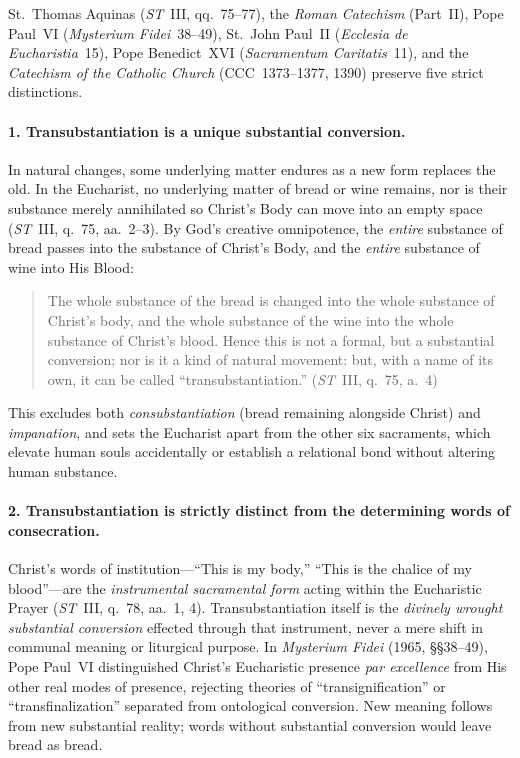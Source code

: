St.~Thomas Aquinas (\emph{ST}~III, qq.~75--77), the \emph{Roman Catechism} (Part~II), Pope Paul~VI (\emph{Mysterium Fidei}~38--49), St.~John Paul~II (\emph{Ecclesia de Eucharistia}~15), Pope Benedict~XVI (\emph{Sacramentum Caritatis}~11), and the \emph{Catechism of the Catholic Church} (CCC~1373--1377, 1390) preserve five strict distinctions.

\paragraph{1. Transubstantiation is a unique substantial conversion.}
In natural changes, some underlying matter endures as a new form replaces the old. In the Eucharist, no underlying matter of bread or wine remains, nor is their substance merely annihilated so Christ's Body can move into an empty space (\emph{ST}~III, q.~75, aa.~2--3). By God's creative omnipotence, the \emph{entire} substance of bread passes into the substance of Christ's Body, and the \emph{entire} substance of wine into His Blood:
\begin{quotation}
The whole substance of the bread is changed into the whole substance of Christ's body, and the whole substance of the wine into the whole substance of Christ's blood. Hence this is not a formal, but a substantial conversion; nor is it a kind of natural movement: but, with a name of its own, it can be called ``transubstantiation.'' (\emph{ST}~III, q.~75, a.~4)
\end{quotation}
This excludes both \emph{consubstantiation} (bread remaining alongside Christ) and \emph{impanation}, and sets the Eucharist apart from the other six sacraments, which elevate human souls accidentally or establish a relational bond without altering human substance.

\paragraph{2. Transubstantiation is strictly distinct from the determining words of consecration.}
Christ's words of institution---``This is my body,'' ``This is the chalice of my blood''---are the \emph{instrumental sacramental form} acting within the Eucharistic Prayer (\emph{ST}~III, q.~78, aa.~1, 4). Transubstantiation itself is the \emph{divinely wrought substantial conversion} effected through that instrument, never a mere shift in communal meaning or liturgical purpose. In \emph{Mysterium Fidei} (1965, \S\S38--49), Pope Paul~VI distinguished Christ's Eucharistic presence \emph{par excellence} from His other real modes of presence, rejecting theories of ``transignification'' or ``transfinalization'' separated from ontological conversion. New meaning follows from new substantial reality; words without substantial conversion would leave bread as bread.

